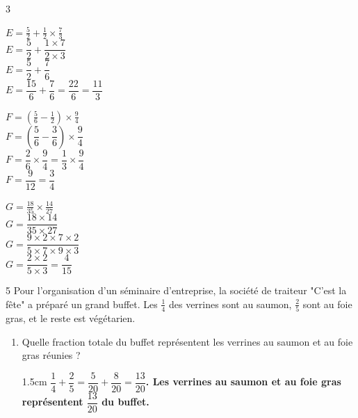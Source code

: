 \documentclass[a4paper]{book}
\begin{document}
{\begin{exerciceNote}{3}
        \vspace{0.5cm}
        \begin{minipage}[t]{0.31\textwidth}
            $E = \frac{5}{2} + \frac{1}{2} \times \frac{7}{3}$ \\
            \color{red}\bfseries
            $E = \dfrac{5}{2} + \dfrac{1 \times 7}{2 \times 3}$ \\
            $E = \dfrac{5}{2} + \dfrac{7}{6}$ \\
            $E = \dfrac{15}{6} + \dfrac{7}{6} = \dfrac{22}{6} = \dfrac{11}{3}$
            \vspace{1.5cm}
        \end{minipage}\hfill \vline \hfill
        \begin{minipage}[t]{0.31\textwidth}
            $F = \left( \frac{5}{6} - \frac{1}{2} \right) \times \frac{9}{4}$ \\
            \color{red}\bfseries
            $F = \left( \dfrac{5}{6} - \dfrac{3}{6} \right) \times \dfrac{9}{4}$ \\
            $F = \dfrac{2}{6} \times \dfrac{9}{4} = \dfrac{1}{3} \times \dfrac{9}{4}$ \\
            $F = \dfrac{9}{12} = \dfrac{3}{4}$
            \vspace{1.5cm}
        \end{minipage}\hfill \vline \hfill
        \begin{minipage}[t]{0.31\textwidth}
            $G = \frac{18}{35} \times \frac{14}{27}$ \\
            \color{red}\bfseries
            $G = \dfrac{18 \times 14}{35 \times 27}$ \\
            $G = \dfrac{9 \times 2 \times 7 \times 2}{5 \times 7 \times 9 \times 3}$ \\
            $G = \dfrac{2 \times 2}{5 \times 3} = \dfrac{4}{15}$
            \vspace{1.5cm}
        \end{minipage}
    \end{exerciceNote}
    
    \begin{exerciceNote}{5}       
        Pour l'organisation d'un séminaire d'entreprise, la société de traiteur "C'est la fête" a préparé un grand buffet. Les $\frac{1}{4}$ des verrines sont au saumon, $\frac{2}{5}$ sont au foie gras, et le reste est végétarien.
        \begin{enumerate}
            \item Quelle fraction totale du buffet représentent les verrines au saumon et au foie gras réunies ?
            \begin{ZoneReponse}{1.5cm}
                \color{red}\bfseries
                $\dfrac{1}{4} + \dfrac{2}{5} = \dfrac{5}{20} + \dfrac{8}{20} = \dfrac{13}{20}$. Les verrines au saumon et au foie gras représentent $\dfrac{13}{20}$ du buffet.
            \end{ZoneReponse}
            

\end{enumerate}
\end{exerciceNote}}
\end{document}
